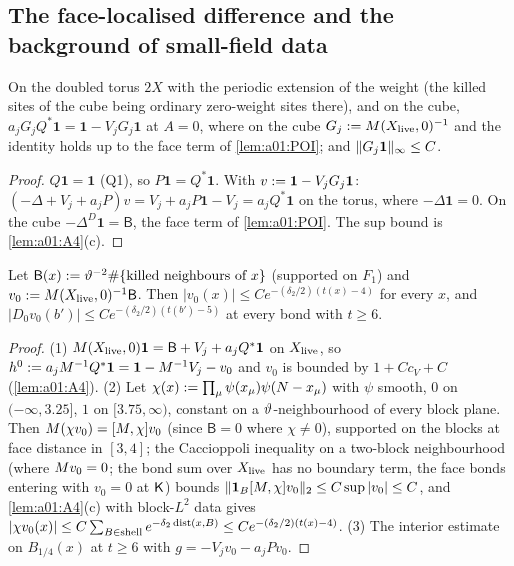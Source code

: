 \subsection{The face-localised difference and the background of small-field data}\label{app:a01:fld}

\begin{lemma}\label{lem:a01:RC}
On the doubled torus $2X$ with the periodic extension of the weight (the killed sites of the cube being ordinary zero-weight sites there), and on the cube, $a_jG_jQ^*\mathbf 1=\mathbf 1-V_jG_j\mathbf 1$ at $A=0$, where on the cube $G_j:=M(X_{\mathrm{live}},0)^{-1}$ and the identity holds up to the face term of \cref{lem:a01:POI}; and $\lVert G_j\mathbf 1\rVert_\infty\le C$.
\end{lemma}
\begin{proof}
$Q\mathbf 1=\mathbf 1$ (Q1), so $P\mathbf 1=Q^*\mathbf 1$. With $v:=\mathbf 1-V_jG_j\mathbf 1$: $(-\Delta+V_j+a_jP)v=V_j+a_jP\mathbf 1-V_j=a_jQ^*\mathbf 1$ on the torus, where $-\Delta\mathbf 1=0$. On the cube $-\Delta^D\mathbf 1=\mathsf B$, the face term of \cref{lem:a01:POI}. The sup bound is \cref{lem:a01:A4}(c).
\end{proof}

\begin{lemma}\label{lem:a01:POI}
Let $\mathsf B(x):=\vartheta^{-2}\#\{\text{killed neighbours of }x\}$ (supported on $F_1$) and $v_0:=M(X_{\mathrm{live}},0)^{-1}\mathsf B$. Then $|v_0(x)|\le Ce^{-(\delta_2/2)(t(x)-4)}$ for every $x$, and $|D_0v_0(b')|\le Ce^{-(\delta_2/2)(t(b')-5)}$ at every bond with $t\ge6$.
\end{lemma}
\begin{proof}
(1) $M(X_{\mathrm{live}},0)\mathbf 1=\mathsf B+V_j+a_jQ^*\mathbf 1$ on $X_{\mathrm{live}}$, so $h^0:= a_jM^{-1}Q^*\mathbf 1=\mathbf 1-M^{-1}V_j-v_0$ and $v_0$ is bounded by $1+Cc_V+C$ (\cref{lem:a01:A4}). (2) Let $\chi(x):=\prod_\mu\psi(x_\mu)\psi(N-x_\mu)$ with $\psi$ smooth, $0$ on $(-\infty,3.25]$, $1$ on $[3.75,\infty)$, constant on a $\vartheta$-neighbourhood of every block plane. Then $M(\chi v_0)=[M,\chi]v_0$ (since $\mathsf B=0$ where $\chi\ne0$), supported on the blocks at face distance in $[3,4]$; the Caccioppoli inequality on a two-block neighbourhood (where $M v_0=0$; the bond sum over $X_{\mathrm{live}}$ has no boundary term, the face bonds entering with $v_0=0$ at $\mathsf K$) bounds $\lVert \mathbf 1_B[M,\chi]v_0\rVert_2\le C\sup|v_0|\le C$, and \cref{lem:a01:A4}(c) with block-$L^2$ data gives $|\chi v_0(x)|\le C\sum_{B\in\text{shell}}e^{-\delta_2\operatorname{dist}(x,B)}\le Ce^{-(\delta_2/2)(t(x)-4)}$. (3) The interior estimate on $B_{1/4}(x)$ at $t\ge6$ with $g=-V_jv_0-a_jPv_0$.
\end{proof}

